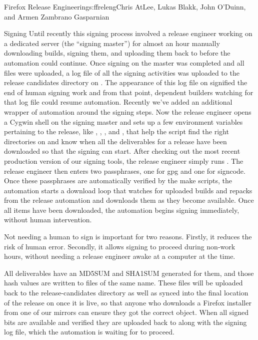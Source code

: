 \begin{aosachapter}{Firefox Release Engineering}{s:ffreleng}{Chris AtLee, Lukas Blakk, John O'Duinn, and Armen Zambrano Gasparnian}
\begin{aosasect1}{Signing}
Until recently this signing process involved a release engineer
working on a dedicated server (the ``signing master'') for almost an
hour manually downloading builds, signing them, and
uploading them back to  before the automation could
continue.  Once signing on the master was completed and all files were
uploaded, a log file of all the signing activities was uploaded to
the release candidates directory on .  The appearance
of this log file on  signified the end of human signing
work and from that point, dependent builders watching for that log
file could resume automation.  Recently we've added an additional
wrapper of automation around the signing steps. Now the release engineer 
opens a Cygwin shell on the signing master
and sets up a few environment variables pertaining to the release, like
, , , and , that
help the script find the right directories on  and know
when all the deliverables for a release have been downloaded so that
the signing can start. After checking out the most recent production
version of our signing tools, the release engineer simply runs
. The release engineer then enters two
passphrases, one for gpg and one for signcode. Once these passphrases
are automatically verified by the make scripts, the automation
starts a download loop that watches for uploaded builds and repacks
from the release automation and downloads them as they become
available.  Once all items have been downloaded, the automation
begins signing immediately, without human intervention. 

Not needing a
human to sign is important for two reasons. Firstly, it reduces the
risk of human error. Secondly, it allows signing to
proceed during non-work hours, without needing a release engineer
awake at a computer at the time.  


All deliverables have an MD5SUM and SHA1SUM generated for them, and
those hash values are written to files of the same name.  These files
will be uploaded back to the release-candidates directory as well as
synced into the final location of the release on  once
it is live, so that anyone who downloads a Firefox installer from one of our
mirrors can ensure they got the correct object. When all signed bits
are available and verified 
 they are uploaded back to  along
with the signing log file, which the automation is waiting for to
proceed.



\end{aosasect1}
\end{aosachapter}
